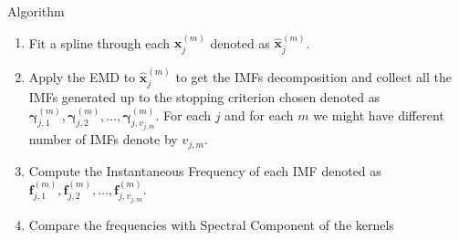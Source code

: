 \documentclass[11pt, a4paper]{article} %
\begin{document}
\hfill

\begin{algorithm}[H]


\label{algo_exp1}
\caption{Algorithm}

\BlankLine
\addtolength\linewidth{-12ex}


\begin{enumerate}




\item Fit a spline through each $\mathbf{x}_j^{(m)}$ denoted as $\hat{\mathbf{x}}_j^{(m)}$.

\item Apply the EMD to $ \hat{\mathbf{x}}_j^{(m)}$ to get the IMFs decomposition and collect all the IMFs generated up to the stopping criterion chosen denoted as $\bm{\gamma}^{(m)}_{j,1}, \bm{\gamma}_{j,2}^{(m)}, \dots, \bm{\gamma}_{j,v_{j,m}}^{(m)}$. For each $j$ and for each $m$ we might have different number of IMFs denote by $v_{j,m}$.

\item Compute the Instantaneous Frequency of each IMF denoted as $\bm{f}^{(m)}_{j,1}, \bm{f}_{j,2}^{(m)}, \dots, \bm{f}_{j,v_{j,m}}^{(m)}$.
\item Compare the frequencies with Spectral Component of the kernels


\end{enumerate}

\end{algorithm}


\newpage
\end{document}
